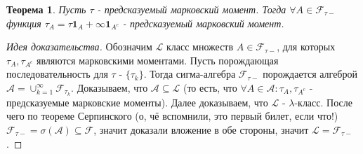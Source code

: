 \documentclass[16pt]{article}
\newtheorem{theorem}{Теорема}[section]
\theoremstyle{definition}
\begin{document}
\begin{theorem}
Пусть $\tau$ - предсказуемый марковский момент. Тогда $\forall A \in \mathcal{F}_{\tau-}$ функция $\tau_A = \tau\mathbf{1}_A + \infty\mathbf{1}_{A^c}$ - предсказуемый марковский момент.
\end{theorem}
\begin{proof}[Идея доказательства]
Обозначим $\mathcal{L}$ класс множеств $A \in \mathcal{F}_{\tau-}$, для которых $\tau_A, \tau_{A^c}$ являются марковскими моментами. Пусть порождающая последовательность для $\tau$ - $\{\tau_k\}$. Тогда сигма-алгебра $\mathcal{F}_{\tau-}$ порождается алгеброй $\mathcal{A} = \cup_{k = 1}^\infty \mathcal{F}_{\tau_k}$. Доказываем, что $\mathcal{A} \subseteq \mathcal{L}$ (то есть, что $\forall A \in \mathcal{A}: \tau_A, \tau_{A^c}$ - предсказуемые марковские моменты). Далее доказываем, что $\mathcal{L}$ - $\lambda$-класс. После чего по теореме Серпинского (о, чё вспомнили, это первый билет, если что!) $\mathcal{F}_{\tau-} = \sigma(\mathcal{A}) \subseteq \mathcal{F}$, значит доказали вложение в обе стороны, значит $\mathcal{L} = \mathcal{F}_{\tau-}$.
\end{proof}
\end{document}

